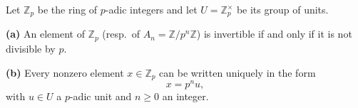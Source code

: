 Let $\mathbb{Z}_p$ be the ring of $p$-adic integers and let $U = \mathbb{Z}_p^\times$ be its group of units.

\textbf{(a)} An element of $\mathbb{Z}_p$ (resp.\ of $A_n = \mathbb{Z}/p^n\mathbb{Z}$) is invertible if and only if it is not divisible by $p$.

\textbf{(b)} Every nonzero element $x \in \mathbb{Z}_p$ can be written uniquely in the form
$$x = p^n u,$$
with $u \in U$ a $p$-adic unit and $n \geq 0$ an integer.
